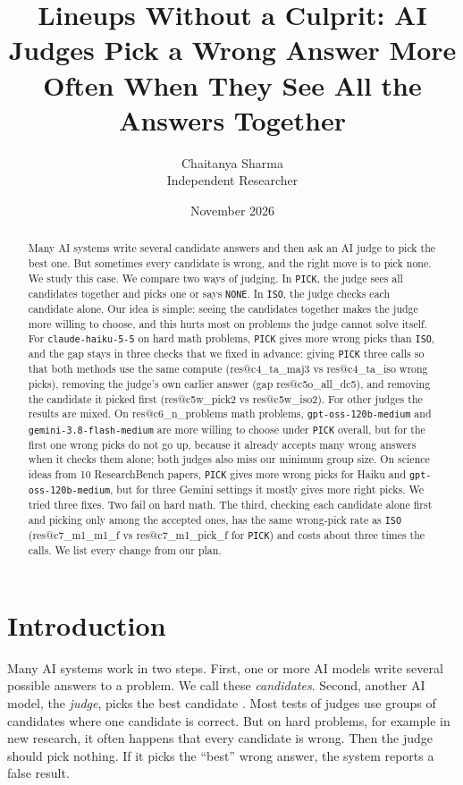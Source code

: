 \documentclass[10pt,twocolumn]{article}
\title{Lineups Without a Culprit: AI Judges Pick a Wrong Answer More Often When They See All the Answers Together}
\author{Chaitanya Sharma\\Independent Researcher}
\date{November 2026}
\makeatletter
\newcommand{\res}[1]{\csname res@#1\endcsname}
\makeatother
\begin{document}
\sloppy
\maketitle

\begin{abstract}
Many AI systems write several candidate answers and then ask an AI judge to pick the best one. But sometimes every candidate is wrong, and the right move is to pick none. We study this case. We compare two ways of judging. In \texttt{PICK}, the judge sees all candidates together and picks one or says \texttt{NONE}. In \texttt{ISO}, the judge checks each candidate alone. Our idea is simple: seeing the candidates together makes the judge more willing to choose, and this hurts most on problems the judge cannot solve itself. For \texttt{claude-haiku-5-5} on hard math problems, \texttt{PICK} gives more wrong picks than \texttt{ISO}, and the gap stays in three checks that we fixed in advance: giving \texttt{PICK} three calls so that both methods use the same compute (\res{c4_ta_maj3} vs \res{c4_ta_iso} wrong picks), removing the judge's own earlier answer (gap \res{c5o_all_dc5}), and removing the candidate it picked first (\res{c5w_pick2} vs \res{c5w_iso2}). For other judges the results are mixed. On \res{c6_n_problems} math problems, \texttt{gpt-oss-120b-medium} and \texttt{gemini-3.8-flash-medium} are more willing to choose under \texttt{PICK} overall, but for the first one wrong picks do not go up, because it already accepts many wrong answers when it checks them alone; both judges also miss our minimum group size. On science ideas from 10 ResearchBench papers, \texttt{PICK} gives more wrong picks for Haiku and \texttt{gpt-oss-120b-medium}, but for three Gemini settings it mostly gives more right picks. We tried three fixes. Two fail on hard math. The third, checking each candidate alone first and picking only among the accepted ones, has the same wrong-pick rate as \texttt{ISO} (\res{c7_m1_m1_f} vs \res{c7_m1_pick_f} for \texttt{PICK}) and costs about three times the calls. We list every change from our plan.
\end{abstract}

\section{Introduction}
Many AI systems work in two steps. First, one or more AI models write several possible answers to a problem. We call these \emph{candidates}. Second, another AI model, the \emph{judge}, picks the best candidate \citep{cobbe2021training,brown2024large,gottweis2025towards,zheng2023judging}. Most tests of judges use groups of candidates where one candidate is correct. But on hard problems, for example in new research, it often happens that every candidate is wrong. Then the judge should pick nothing. If it picks the ``best'' wrong answer, the system reports a false result.
\end{document}
